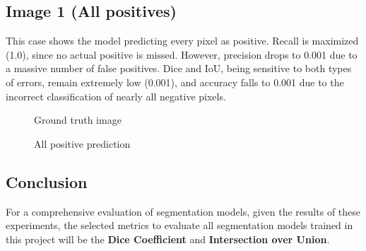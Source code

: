 \documentclass[openany, 12pt]{article}
\begin{document}
\subsection*{Image 1 (All positives)}
This case shows the model predicting every pixel as positive. Recall is maximized (1.0), since no actual positive is missed. However, precision drops to 0.001 due to a massive number of false positives. Dice and IoU, being sensitive to both types of errors, remain extremely low (0.001), and accuracy falls to 0.001 due to the incorrect classification of nearly all negative pixels.
\begin{figure}[htbp]
	\centering
	\begin{minipage}{0.47\textwidth}
		\centering
		\caption{Ground truth image}
	\end{minipage}
	\hspace{0.01\textwidth}
	\begin{minipage}{0.47\textwidth}
		\centering
		\caption{All positive prediction}
	\end{minipage}
\end{figure}
\subsection{Conclusion}
For a comprehensive evaluation of segmentation models, given the results of these experiments, the selected metrics to evaluate all segmentation models trained in this project will be the \textbf{Dice Coefficient} and \textbf{Intersection over Union}. 
\newpage
\end{document}

